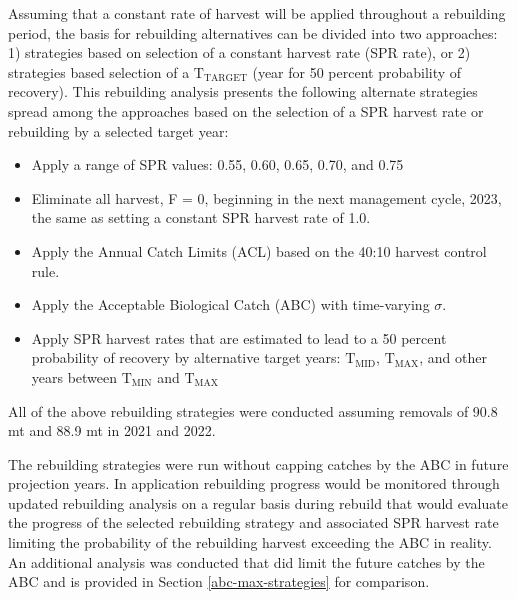 \documentclass[11pt,
  english,
  a4paper,
]{article}
\begin{document}
\leavevmode\tagmcend\tagstructend


Assuming that a constant rate of harvest will be applied throughout a rebuilding period, the basis for rebuilding alternatives can be divided into two approaches: 1) strategies based on selection of a constant harvest rate (SPR rate), or 2) strategies based selection of a {\(\text{T}_\text{TARGET}\)\leavevmode\tagmcend\tagstructend} (year for 50 percent probability of recovery). This rebuilding analysis presents the following alternate strategies spread among the approaches based on the selection of a SPR harvest rate or rebuilding by a selected target year:

\leavevmode\tagmcend\tagstructend\par

\begin{itemize}
    \item Apply a range of SPR values: 0.55, 0.60, 0.65, 0.70, and 0.75 
    \item Eliminate all harvest, F = 0, beginning in the next management cycle, 2023, the same as setting a constant SPR harvest rate of 1.0.
    \item Apply the Annual Catch Limits (ACL) based on the 40:10 harvest control rule.
    \item Apply the Acceptable Biological Catch (ABC) with time-varying $\sigma$.
    \item Apply SPR harvest rates that are estimated to lead to a 50 percent probability of recovery by alternative target years: $\text{T}_\text{MID}$, $\text{T}_\text{MAX}$, and other years between $\text{T}_\text{MIN}$ and $\text{T}_\text{MAX}$
\end{itemize}


All of the above rebuilding strategies were conducted assuming removals of 90.8 mt and 88.9 mt in 2021 and 2022.

\leavevmode\tagmcend\tagstructend\par


The rebuilding strategies were run without capping catches by the ABC in future projection years. In application rebuilding progress would be monitored through updated rebuilding analysis on a regular basis during rebuild that would evaluate the progress of the selected rebuilding strategy and associated SPR harvest rate limiting the probability of the rebuilding harvest exceeding the ABC in reality. An additional analysis was conducted that did limit the future catches by the ABC and is provided in Section \ref{abc-max-strategies} for comparison.
\end{document}
